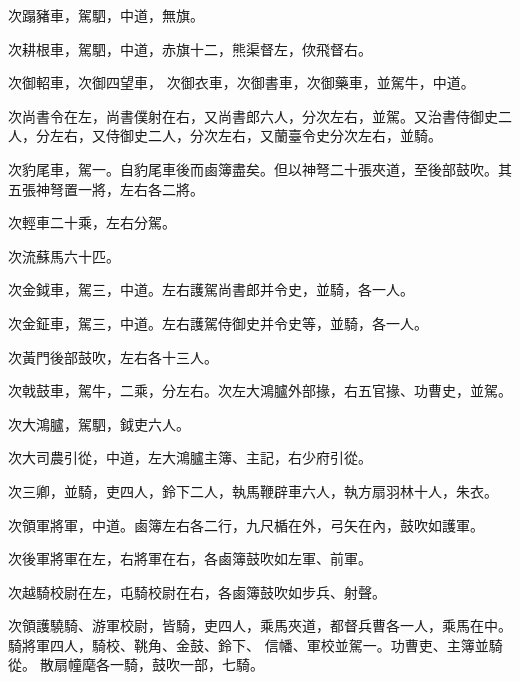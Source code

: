 \begin{pinyinscope}
 次蹋豬車，駕駟，中道，無旗。



 次耕根車，駕駟，中道，赤旗十二，熊渠督左，佽飛督右。



 次御軺車，次御四望車，
 次御衣車，次御書車，次御藥車，並駕牛，中道。



 次尚書令在左，尚書僕射在右，又尚書郎六人，分次左右，並駕。又治書侍御史二人，分左右，又侍御史二人，分次左右，又蘭臺令史分次左右，並騎。



 次豹尾車，駕一。自豹尾車後而鹵簿盡矣。但以神弩二十張夾道，至後部鼓吹。其五張神弩置一將，左右各二將。



 次輕車二十乘，左右分駕。



 次流蘇馬六十匹。



 次金鉞車，駕三，中道。左右護駕尚書郎并令史，並騎，各一人。



 次金鉦車，駕三，中道。左右護駕侍御史并令史等，並騎，各一人。



 次黃門後部鼓吹，左右各十三人。



 次戟鼓車，駕牛，二乘，分左右。次左大鴻臚外部掾，右五官掾、功曹史，並駕。



 次大鴻臚，駕駟，鉞吏六人。



 次大司農引從，中道，左大鴻臚主簿、主記，右少府引從。



 次三卿，並騎，吏四人，鈴下二人，執馬鞭辟車六人，執方扇羽林十人，朱衣。



 次領軍將軍，中道。鹵簿左右各二行，九尺楯在外，弓矢在內，鼓吹如護軍。



 次後軍將軍在左，右將軍在右，各鹵簿鼓吹如左軍、前軍。



 次越騎校尉在左，屯騎校尉在右，各鹵簿鼓吹如步兵、射聲。



 次領護驍騎、游軍校尉，皆騎，吏四人，乘馬夾道，都督兵曹各一人，乘馬在中。騎將軍四人，騎校、鞉角、金鼓、鈴下、
 信幡、軍校並駕一。功曹吏、主簿並騎從。散扇幢麾各一騎，鼓吹一部，七騎。




\end{pinyinscope}
